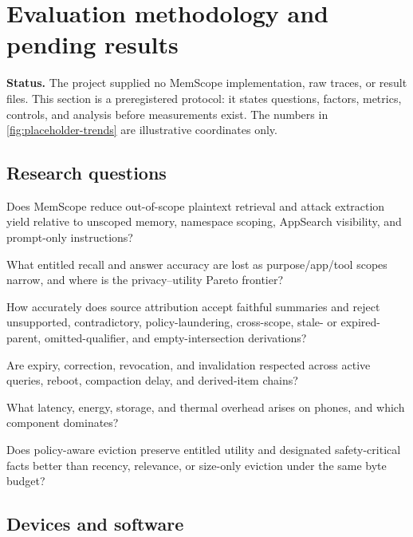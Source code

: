 \section{Evaluation methodology and pending results}
\label{sec:evaluation}

\textbf{Status.} \placeholder{} The project supplied no MemScope implementation, raw traces, or result files. This section is a preregistered protocol: it states questions, factors, metrics, controls, and analysis before measurements exist. The numbers in \cref{fig:placeholder-trends} are illustrative coordinates only.

\subsection{Research questions}

\begin{description}[leftmargin=13mm,style=nextline]
  \item[RQ1: Enforcement.] Does MemScope reduce out-of-scope plaintext retrieval and attack extraction yield relative to unscoped memory, namespace scoping, AppSearch visibility, and prompt-only instructions?
  \item[RQ2: Utility.] What entitled recall and answer accuracy are lost as purpose/app/tool scopes narrow, and where is the privacy--utility Pareto frontier?
  \item[RQ3: Derivation.] How accurately does source attribution accept faithful summaries and reject unsupported, contradictory, policy-laundering, cross-scope, stale- or expired-parent, omitted-qualifier, and empty-intersection derivations?
  \item[RQ4: Lifecycle.] Are expiry, correction, revocation, and invalidation respected across active queries, reboot, compaction delay, and derived-item chains?
  \item[RQ5: Mobile cost.] What latency, energy, storage, and thermal overhead arises on phones, and which component dominates?
  \item[RQ6: Retention.] Does policy-aware eviction preserve entitled utility and designated safety-critical facts better than recency, relevance, or size-only eviction under the same byte budget?
\end{description}



\subsection{Devices and software}

